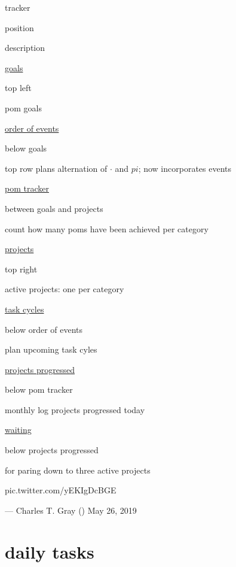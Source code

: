 \documentclass[]{book}
\newenvironment{Shaded}{\begin{snugshade}}{\end{snugshade}}
\newcommand{\ControlFlowTok}[1]{\textcolor[rgb]{0.13,0.29,0.53}{\textbf{#1}}}
\newcommand{\DataTypeTok}[1]{\textcolor[rgb]{0.13,0.29,0.53}{#1}}
\newcommand{\KeywordTok}[1]{\textcolor[rgb]{0.13,0.29,0.53}{\textbf{#1}}}
\newcommand{\NormalTok}[1]{#1}
\newcommand{\OperatorTok}[1]{\textcolor[rgb]{0.81,0.36,0.00}{\textbf{#1}}}
\newcommand{\StringTok}[1]{\textcolor[rgb]{0.31,0.60,0.02}{#1}}
\begin{document}
tracker

position

description

\href{dayview:goals}{goals}

top left

pom goals

\href{dayview:order-of-events}{order of events}

below goals

top row plans alternation of \(\cdot\) and \(pi\); now incorporates events

\href{dayview:pom-tracker}{pom tracker}

between goals and projects

count how many poms have been achieved per category

\href{dayview:projects}{projects}

top right

active projects: one per category

\href{dayview:task-cycles}{task cycles}

below order of events

plan upcoming task cyles

\href{dayview:progressed}{projects progressed}

below pom tracker

monthly log projects progressed today

\href{dayview:waiting}{waiting}

below projects progressed

for paring down to three active projects

pic.twitter.com/yEKIgDcBGE

--- Charles T. Gray (\citet{cantabile}) May 26, 2019

\hypertarget{daily-tasks}{%
\section{daily tasks}\label{daily-tasks}}

\begin{Shaded}
\end{Shaded}
\end{document}
